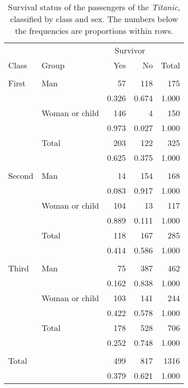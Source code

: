 \begin{table}
\caption{
Survival status of the passengers of the \emph{Titanic}, classified by
class and sex.
The numbers below the frequencies are proportions within rows.
}
\label{t_titanic3}
\begin{center}
\begin{tabular}{|l|l|rr|r|}\hline
& & \multicolumn{2}{|c|}{Survivor} & \\
Class & Group & Yes & No & Total \\
\hline
\multicolumn{5}{l}{\vspace*{-2ex}}
\\ \hline
First & Man & 57 & 118 & 175 \\
&  & 0.326 & 0.674 & 1.000 \\
& Woman or child & 146 & 4 & 150 \\
&  & 0.973 & 0.027 & 1.000 \\ \hline
& Total & 203 & 122 & 325 \\
&  & 0.625 & 0.375 & 1.000 \\
\hline
\multicolumn{5}{l}{\vspace*{-2ex}}
\\ \hline
Second & Man & 14 & 154 & 168 \\
&  & 0.083 & 0.917 & 1.000 \\
& Woman or child & 104 & 13 & 117 \\
&  & 0.889 & 0.111 & 1.000 \\ \hline
& Total & 118 & 167 & 285 \\
&  & 0.414 & 0.586 & 1.000 \\
\hline \multicolumn{5}{l}{\vspace*{-2ex}}\\ \hline
Third & Man & 75 & 387 & 462 \\
&  & 0.162 & 0.838 & 1.000 \\
& Woman or child & 103 & 141 & 244 \\
&  & 0.422 & 0.578 & 1.000 \\ \hline
& Total & 178 & 528 & 706 \\
&  & 0.252 & 0.748 & 1.000 \\
\hline \multicolumn{5}{l}{\vspace*{-2ex}}\\ \hline
Total & & 499 & 817 & 1316 \\
&  & 0.379 & 0.621 & 1.000 \\
\hline
\end{tabular}
\end{center}
\end{table}

